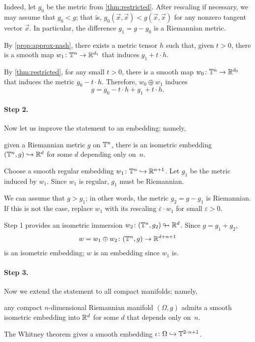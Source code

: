 Indeed, let $g_0$ be the metric from \ref{thm:restricted}.
After rescaling if necessary, we may assume that $g_0<g$; that is, $g_0(\vec x,\vec x)<g(\vec x,\vec x)$ for any nonzero tangent vector $\vec x$.
In particular, the difference $g_1=g-g_0$ is a Riemannian metric.

By \ref{prop:approx-nash}, there exists a metric tensor $h$ such that, given $t>0$, there is a smooth map $w_1\colon\mathbb{T}^n\to \mathbb{R}^{d_1}$ that induces $g_1+t\cdot h$.

By \ref{thm:restricted}, for any small $t>0$, there is a smooth map $w_0\colon\mathbb{T}^n\to \mathbb{R}^{d_0}$ that induces the metric $g_0-t \cdot h$.
Therefore, $w_0\oplus w_1$ induces
\[g=g_0-t\cdot h+g_1+t\cdot h.\]

\paragraph{Step 2.}
Now let us improve the statement to an embedding; namely,
\begin{clm}{}
given a Riemannian metric $g$ on $\mathbb{T}^n$, there is an isometric embedding $(\mathbb{T}^n,g)\hookrightarrow\mathbb{R}^d$ for some $d$ depending only on~$n$.
\end{clm}

Choose a smooth regular embedding $w_1\colon\mathbb{T}^n\hookrightarrow \mathbb{R}^{n+1}$.
Let $g_1$ be the metric induced by $w_1$.
Since $w_1$ is regular, $g_1$ must be Riemannian.

We can assume that $g>g_1$; in other words, the metric $g_2=g-g_1$ is Riemannian.
If this is not the case, replace $w_1$ with its rescaling $\varepsilon \cdot w_1$ for small $\varepsilon > 0$.

Step 1 provides an isometric immersion $w_2\colon(\TT^n,g_2)\z\looparrowright \RR^d$.
Since $g=g_1+g_2$,
\[w=w_1\oplus w_2\colon (\mathbb{T}^n,g)\to \mathbb{R}^{d+ n+1}\]
is an isometric embedding; $w$ is an embedding since $w_1$ is.

\paragraph{Step 3.} Now we extend the statement to all compact manifolds; namely,
\begin{clm}{}
any compact $n$-dimensional Riemannian manifold $(\Omega,g)$ admits a smooth isometric embedding into $\mathbb{R}^d$ for some $d$ that depends only on~$n$.
\end{clm}

The Whitney theorem gives a smooth embedding $\iota\colon\Omega\hookrightarrow\TT^{2\cdot n+1}$.

